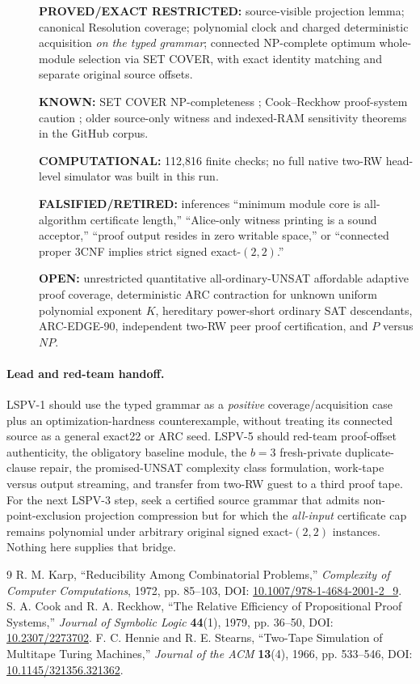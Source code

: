 \begin{description}
\item[] \textbf{PROVED/EXACT RESTRICTED:} source-visible projection lemma; canonical Resolution coverage; polynomial clock and charged deterministic acquisition \emph{on the typed grammar}; connected NP-complete optimum whole-module selection via SET COVER, with exact identity matching and separate original source offsets.
\item[] \textbf{KNOWN:} SET COVER NP-completeness \cite{karp}; Cook--Reckhow proof-system caution \cite{cr}; older source-only witness and indexed-RAM sensitivity theorems in the GitHub corpus.
\item[] \textbf{COMPUTATIONAL:} 112,816 finite checks; no full native two-RW head-level simulator was built in this run.
\item[] \textbf{FALSIFIED/RETIRED:} inferences ``minimum module core is all-algorithm certificate length,'' ``Alice-only witness printing is a sound acceptor,'' ``proof output resides in zero writable space,'' or ``connected proper 3CNF implies strict signed exact-$(2,2)$.''
\item[] \textbf{OPEN:} unrestricted quantitative all-ordinary-UNSAT affordable adaptive proof coverage, deterministic ARC contraction for unknown uniform polynomial exponent $K$, hereditary power-short ordinary SAT descendants, ARC-EDGE-90, independent two-RW peer proof certification, and $P$ versus $NP$.
\end{description}

\paragraph{Lead and red-team handoff.}
LSPV-1 should use the typed grammar as a \emph{positive} coverage/acquisition case plus an optimization-hardness counterexample, without treating its connected source as a general exact22 or ARC seed. LSPV-5 should red-team proof-offset authenticity, the obligatory baseline module, the $b=3$ fresh-private duplicate-clause repair, the promised-UNSAT complexity class formulation, work-tape versus output streaming, and transfer from two-RW guest to a third proof tape. For the next LSPV-3 step, seek a certified source grammar that admits non-point-exclusion projection compression but for which the \emph{all-input} certificate cap remains polynomial under arbitrary original signed exact-$(2,2)$ instances. Nothing here supplies that bridge.

\begin{thebibliography}{9}
 R. M. Karp, ``Reducibility Among Combinatorial Problems,'' \emph{Complexity of Computer Computations}, 1972, pp. 85--103, DOI: \href{https://doi.org/10.1007/978-1-4684-2001-2_9}{10.1007/978-1-4684-2001-2\_9}.
 S. A. Cook and R. A. Reckhow, ``The Relative Efficiency of Propositional Proof Systems,'' \emph{Journal of Symbolic Logic} \textbf{44}(1), 1979, pp. 36--50, DOI: \href{https://doi.org/10.2307/2273702}{10.2307/2273702}.
 F. C. Hennie and R. E. Stearns, ``Two-Tape Simulation of Multitape Turing Machines,'' \emph{Journal of the ACM} \textbf{13}(4), 1966, pp. 533--546, DOI: \href{https://doi.org/10.1145/321356.321362}{10.1145/321356.321362}.
\end{thebibliography}